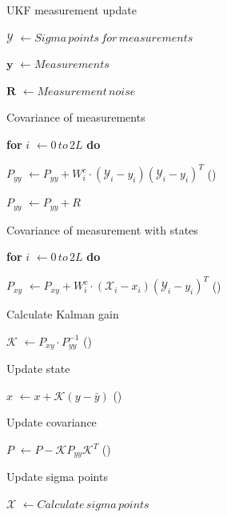\documentclass[../Head/report.tex]{subfiles}
\begin{document}
\begin{Pseudo}{UKF measurement update}{}
\begin{Indentation}

	\item $\mathcal{Y}$ \(\leftarrow Sigma\, points\, for\, measurements \)
	\item $\mathbf{y}$ \(\leftarrow Measurements \)
	\item $\mathbf{R}$ \(\leftarrow Measurement\, noise \)
	\item Covariance of measurements  
	\item \textbf{for} $i$ \(\leftarrow 0\, to\, 2L\) \textbf{do}
        \begin{Indentation}
            \item $P_{yy}$ \(\leftarrow P_{yy} + W^{c}_i \cdot (\mathcal{Y}_i - y_i)(\mathcal{Y}_i - y_i)^T \) \qquad {}(\theequation)\label{eq:update_measurement_covariance_of_measurements}
        \end{Indentation}
     \item  $P_{yy}$ \(\leftarrow  P_{yy} + R\)
        
    \item Covariance of measurement with states 
	\item \textbf{for} $i$ \(\leftarrow 0\, to\, 2L\) \textbf{do}
        \begin{Indentation}
            \item $P_{xy}$ \(\leftarrow P_{xy} + W^{c}_i \cdot (\mathcal{X}_i - x_i)(\mathcal{Y}_i - y_i)^T \)  \qquad {}(\theequation)\label{eq:update_measurement_covariance_of_measurements_with_states}
        \end{Indentation}
        
    \item Calculate Kalman gain  
    \item $\mathcal{K}$ \(\leftarrow P_{xy} \cdot P^{-1}_{yy} \)  \qquad {}(\theequation)\label{eq:update_measurement_kalman_gain}
     
    \item Update state  
    \item $x$ \(\leftarrow x + \mathcal{K}(y- \bar{y}) \)  \qquad {}(\theequation)\label{eq:update_measurement_state}
    
    \item Update covariance   
    \item $P$ \(\leftarrow P - \mathcal{K} P_{yy} \mathcal{K}^T \)  \qquad {}(\theequation)\label{eq:update_measurement_covariance}
    
    \item Update sigma points   
    \item $\mathcal{X}$ \(\leftarrow Calculate\, sigma\, points\)  
\end{Indentation}
\end{Pseudo}
\end{document}

